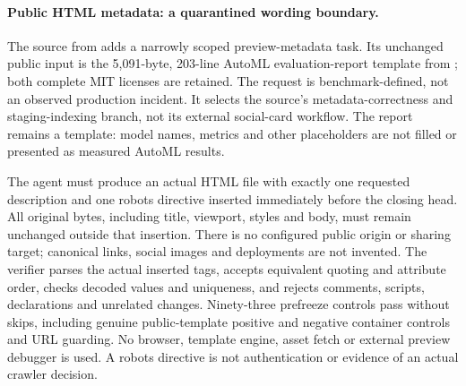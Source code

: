 \paragraph{Public HTML metadata: a quarantined wording boundary.}
The  source from 
adds a narrowly scoped preview-metadata task. Its unchanged public input is the
5,091-byte, 203-line AutoML evaluation-report template from
; both complete MIT licenses
are retained. The request is benchmark-defined, not an observed production
incident. It selects the source's metadata-correctness and staging-indexing
branch, not its external social-card workflow. The report remains a template:
model names, metrics and other placeholders are not filled or presented as
measured AutoML results.

The agent must produce an actual HTML file with exactly one requested
description and one  robots directive inserted immediately
before the closing head. All original bytes, including title, viewport, styles
and body, must remain unchanged outside that insertion. There is no configured
public origin or sharing target; canonical links, social images and deployments
are not invented. The verifier parses the actual inserted tags, accepts
equivalent quoting and attribute order, checks decoded values and uniqueness,
and rejects comments, scripts, declarations and unrelated changes. Ninety-three
prefreeze controls pass without skips, including genuine public-template
positive and negative container controls and URL guarding. No browser, template
engine, asset fetch or external preview debugger is used. A robots directive is
not authentication or evidence of an actual crawler decision.

